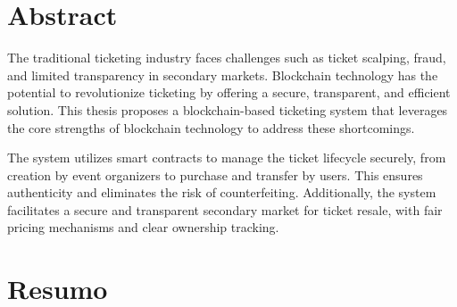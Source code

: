 \chapter*{Abstract}


The traditional ticketing industry faces challenges such as ticket scalping, fraud, and limited transparency in secondary markets. Blockchain technology has the potential to revolutionize ticketing by offering a secure, transparent, and efficient solution. This thesis proposes a blockchain-based ticketing system that leverages the core strengths of blockchain technology to address these shortcomings.

The system utilizes smart contracts to manage the ticket lifecycle securely, from creation by event organizers to purchase and transfer by users. This ensures authenticity and eliminates the risk of counterfeiting. Additionally, the system facilitates a secure and transparent secondary market for ticket resale, with fair pricing mechanisms and clear ownership tracking.



\chapter*{Resumo}
